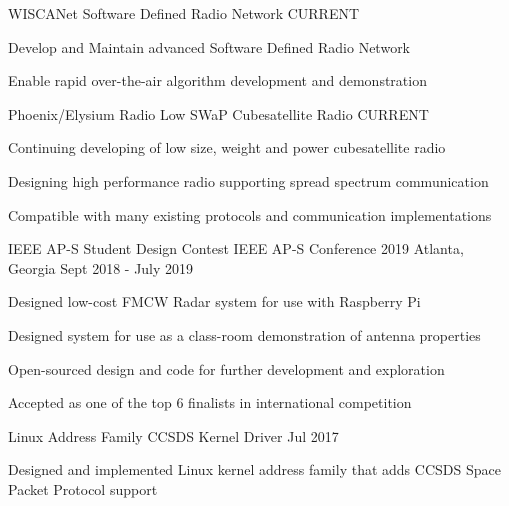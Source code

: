 

\begin{cventries}
    \cventry
    {WISCANet} %
    {Software Defined Radio Network} %
    {} %
    {CURRENT} %
    {
        \begin{cvitems} %
        \item {Develop and Maintain advanced Software Defined Radio Network}
        \item {Enable rapid over-the-air algorithm development and demonstration}
        \end{cvitems}
    }

    \cventry
    {Phoenix/Elysium Radio} %
    {Low SWaP Cubesatellite Radio} %
    {} %
    {CURRENT} %
    {
        \begin{cvitems} %
        \item {Continuing developing of low size, weight and power cubesatellite radio}
        \item {Designing high performance radio supporting spread spectrum communication}
        \item {Compatible with many existing protocols and communication implementations}
        \end{cvitems}
    }

    \cventry
    {IEEE AP-S Student Design Contest}
    {IEEE AP-S Conference 2019}
    {Atlanta, Georgia}
    {Sept 2018 - July 2019}
    {
        \begin{cvitems}
        \item {Designed low-cost FMCW Radar system for use with Raspberry Pi}
        \item {Designed system for use as a class-room demonstration of antenna properties}
        \item {Open-sourced design and code for further development and exploration}
        \item {Accepted as one of the top 6 finalists in international competition}
        \end{cvitems}
    }

    \cventry
    {Linux Address Family} %
    {CCSDS Kernel Driver} %
    {} %
    {Jul 2017} %
    {
        \begin{cvitems} %
        \item {Designed and implemented Linux kernel address family that adds CCSDS Space Packet Protocol support}
        \end{cvitems}
    }

\end{cventries}
